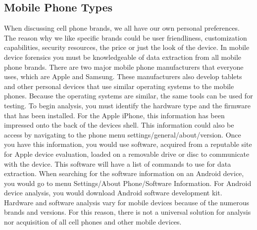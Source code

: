 \documentclass[acmlarge]{style/acmart}
\begin{document}
\subsection{Mobile Phone Types}
When discussing cell phone brands, we all have our own personal preferences.  The reason why we like specific brands could be user friendliness, customization capabilities, security resources, the price or just the look of the device.  In mobile device forensics you must be knowledgeable of data extraction from all mobile phone brands.  There are two major mobile phone manufacturers that everyone uses, which are Apple and Samsung.  These manufacturers also develop tablets and other personal devices that use similar operating systems to the mobile phones.  Because the operating systems are similar, the same tools can be used for testing.  To begin analysis, you must identify the hardware type and the firmware that has been installed.  For the Apple iPhone, this information has been impressed onto the back of the devices shell.  This information could also be access by navigating to the phone menu settings/general/about/version.   Once you have this information, you would use software, acquired from a reputable site for Apple device evaluation, loaded on a removable drive or disc to communicate with the device.  This software will have a list of commands to use for data extraction.  When searching for the software information on an Android device, you would go to menu Settings/About Phone/Software Information.  For Android device analysis, you would download Android software development kit.  Hardware and software analysis vary for mobile devices because of the numerous brands and versions.  For this reason, there is not a universal solution for analysis nor acquisition of all cell phones and other mobile devices.
\end{document}
